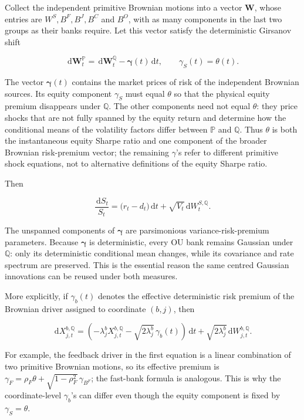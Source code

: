 \documentclass[11pt,a4paper]{article}
\newcommand{\Pp}{\mathbb{P}}
\newcommand{\Qq}{\mathbb{Q}}
\newcommand{\dd}{\,\mathrm{d}}
\begin{document}
Collect the independent primitive Brownian motions into a vector \(\mathbf W\), whose entries
are \(W^S,B^F,B^J,B^C\) and \(B^O\), with as many components in the last two groups as their
banks require. Let this vector satisfy the deterministic Girsanov shift

\begin{equation}
\dd\mathbf W_t^{\Pp}=\dd\mathbf W_t^{\Qq}-\boldsymbol\gamma(t)\dd t,
\qquad \gamma_S(t)=\theta(t).
\label{eq:girsanov}
\end{equation}

The vector \(\boldsymbol\gamma(t)\) contains the market prices of risk of the independent
Brownian sources. Its equity component \(\gamma_S\) must equal \(\theta\) so that the physical
equity premium disappears under \(\Qq\). The other components need not equal \(\theta\): they
price shocks that are not fully spanned by the equity return and determine how the conditional
means of the volatility factors differ between \(\Pp\) and \(\Qq\). Thus \(\theta\) is both the
instantaneous equity Sharpe ratio and one component of the broader Brownian risk-premium vector;
the remaining \(\gamma\)'s refer to different primitive shock equations, not to alternative
definitions of the equity Sharpe ratio.

Then

\begin{equation}
\frac{\dd S_t}{S_t}
=\bigl(r_t-d_t\bigr)\dd t
+\sqrt{V_t}\dd W_t^{S,\Qq}.
\label{eq:stock-Q}
\end{equation}

The unspanned components of \(\boldsymbol\gamma\) are parsimonious variance-risk-premium
parameters. Because \(\boldsymbol\gamma\) is deterministic, every OU bank remains Gaussian
under \(\Qq\): only its
deterministic conditional mean changes, while its covariance and rate spectrum are preserved.
This is the essential reason the same centred Gaussian innovations can be reused under both
measures.

More explicitly, if \(\gamma_b(t)\) denotes the effective deterministic risk premium of the
Brownian driver assigned to coordinate \((b,j)\), then

\begin{equation}
\dd X_{j,t}^{b,\Qq}
=\left(-\lambda_j^bX_{j,t}^{b,\Qq}
-\sqrt{2\lambda_j^b}\,\gamma_b(t)\right)\dd t
+\sqrt{2\lambda_j^b}\dd W_{j,t}^{b,\Qq}.
\label{eq:ou-Q}
\end{equation}

For example, the feedback driver in the first equation is a linear combination of two primitive
Brownian motions, so its effective premium is
\(\gamma_F=\rho_F\theta+\sqrt{1-\rho_F^2}\,\gamma_{B^F}\); the fast-bank formula is analogous.
This is why the coordinate-level \(\gamma_b\)'s can differ even though the equity component is
fixed by \(\gamma_S=\theta\).
\end{document}
